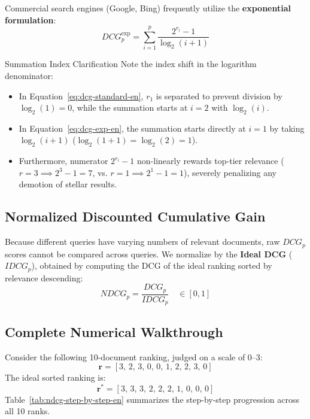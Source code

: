 Commercial search engines (Google, Bing) frequently utilize the \textbf{exponential formulation}:
\begin{equation}
DCG_p^{\text{exp}} = \sum_{i=1}^p \frac{2^{r_i} - 1}{\log_2(i + 1)}
\label{eq:dcg-exp-en}
\end{equation}
\begin{noteblock}{Summation Index Clarification}
Note the index shift in the logarithm denominator:
\begin{itemize}
    \item In Equation~\eqref{eq:dcg-standard-en}, $r_1$ is separated to prevent division by $\log_2(1) = 0$, while the summation starts at $i=2$ with $\log_2(i)$.
    \item In Equation~\eqref{eq:dcg-exp-en}, the summation starts directly at $i=1$ by taking $\log_2(i+1)$ ($\log_2(1+1) = \log_2(2) = 1$).
    \item Furthermore, numerator $2^{r_i} - 1$ non-linearly rewards top-tier relevance ($r=3 \implies 2^3 - 1 = 7$, vs. $r=1 \implies 2^1 - 1 = 1$), severely penalizing any demotion of stellar results.
\end{itemize}
\end{noteblock}

\subsection{Normalized Discounted Cumulative Gain}
Because different queries have varying numbers of relevant documents, raw $DCG_p$ scores cannot be compared across queries. We normalize by the \textbf{Ideal DCG} ($IDCG_p$), obtained by computing the DCG of the ideal ranking sorted by relevance descending:
\begin{equation}
NDCG_p = \frac{DCG_p}{IDCG_p} \quad \in [0, 1]
\end{equation}

\subsection{Complete Numerical Walkthrough}
Consider the following 10-document ranking, judged on a scale of $0$--$3$:
\[
\mathbf{r} = [3, \, 2, \, 3, \, 0, \, 0, \, 1, \, 2, \, 2, \, 3, \, 0]
\]
The ideal sorted ranking is:
\[
\mathbf{r}^* = [3, \, 3, \, 3, \, 2, \, 2, \, 2, \, 1, \, 0, \, 0, \, 0]
\]
Table~\ref{tab:ndcg-step-by-step-en} summarizes the step-by-step progression across all 10 ranks.

